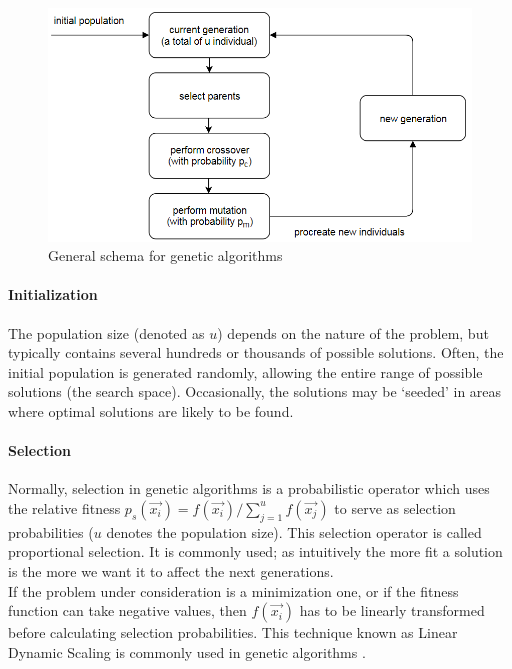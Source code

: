 \documentclass[12pt]{article}
\begin{document}
\begin{figure}[!htb]
\centering
\includegraphics[width=1\textwidth]{ga2}
\caption{General schema for genetic algorithms}
\label{fig:ga}
\end{figure}

\paragraph{Initialization}
The population size (denoted as $u$) depends on the nature of the problem,
but typically contains several hundreds or thousands of possible solutions.
Often, the initial population is generated randomly, allowing the entire range
of possible solutions (the search space).
Occasionally, the solutions may be `seeded' in areas where optimal solutions
are likely to be found.

\paragraph{Selection}
Normally, selection in genetic algorithms is a probabilistic operator
which uses the relative fitness
$ p_s \left( \vec{x_i} \right) = 
f \left( \vec{x_i} \right) / \sum_{j=1}^uf \left( \vec{x_j} \right) $
to serve as selection probabilities ($u$ denotes the population size).
This selection operator is called proportional selection.
It is commonly used; as intuitively the more fit a solution is the more we
want it to affect the next generations.\\
If the problem under consideration is a minimization one,
or if the fitness function can take negative values,
then $ f \left( \vec{x_i} \right) $ has to be
linearly transformed before calculating selection probabilities.
This technique known as Linear Dynamic Scaling is commonly used
in genetic algorithms \cite[pp.~123--124]{goldberg}.
\end{document}
